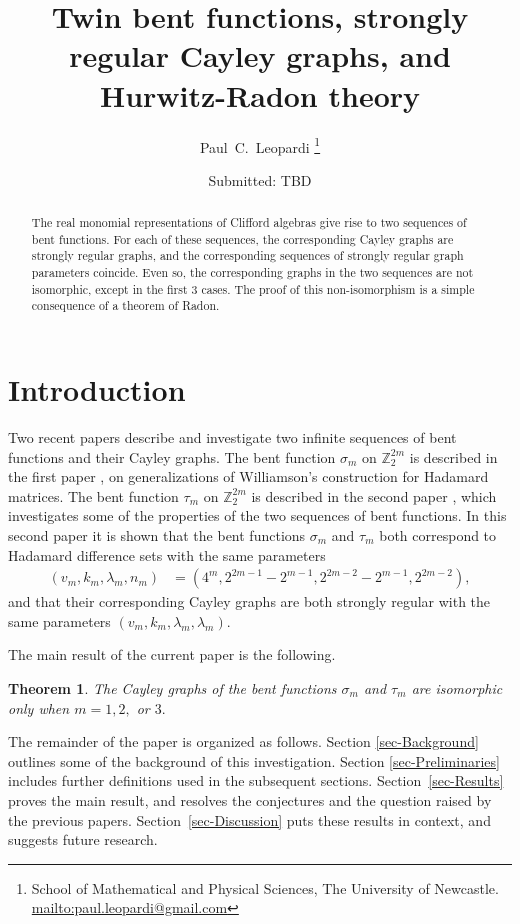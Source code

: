 \documentclass[12pt,a4paper]{article}
\title{Twin bent functions, strongly regular Cayley graphs, and Hurwitz-Radon theory}
\author{
Paul~C.~Leopardi
\thanks{School of Mathematical and Physical Sciences, The University of Newcastle.
\protect\url{mailto:paul.leopardi@gmail.com}}
}
\date{Submitted: TBD}
\newcommand{\mb}[1]{\mathbb{#1}}
\newcommand{\Z}{\mb{Z}}
\newtheorem{Theorem}{Theorem}
\begin{document}
\maketitle

\begin{abstract}
%
The real monomial representations of Clifford algebras
give rise to two sequences of bent functions.
For each of these sequences, the corresponding Cayley graphs are 
strongly regular graphs, and the corresponding sequences of strongly regular graph parameters coincide.
Even so, the corresponding graphs in the two sequences are not isomorphic, except in the first 3 cases.
The proof of this non-isomorphism is a simple consequence of a theorem of Radon.  
%
\end{abstract}

\section{Introduction}
\label{sec-Introduction}
Two recent papers \cite{Leo14Constructions,Leo15Twin} describe and investigate two infinite sequences of bent functions and their Cayley graphs.
The bent function $\sigma_m$ on $\Z_2^{2 m}$ is described in the first paper \cite{Leo14Constructions}, on 
generalizations of Williamson's construction for Hada\-mard matrices.
The bent function $\tau_m$ on $\Z_2^{2 m}$ is described in the second paper \cite{Leo15Twin},
which investigates some of the properties of the two sequences of bent functions.
In this second paper it is shown that the bent functions $\sigma_m$ and $\tau_m$ both correspond to Hada\-mard difference sets with the same parameters
\begin{align*}
(v_m,k_m,\lambda_m,n_m) &= (4^m, 2^{2 m - 1} - 2^{m-1}, 2^{2 m - 2} - 2^{m-1}, 2^{2 m - 2}),
\end{align*}
and that their corresponding Cayley graphs are both strongly regular with the same parameters $(v_m,k_m,\lambda_m,\lambda_m)$.

The main result of the current paper is the following.
\begin{Theorem}\label{HR-non-imomorphic-theorem}
The Cayley graphs of the bent functions $\sigma_m$ and $\tau_m$ are isomorphic only when $m=1, 2,$ or $3.$ 
\end{Theorem}

The remainder of the paper is organized as follows.
Section \ref{sec-Background} outlines some of the background of this investigation.
Section \ref{sec-Preliminaries} includes further definitions used in the subsequent sections.
Section~\ref{sec-Results} proves the main result, and resolves the conjectures and the question raised by the previous papers.
Section~\ref{sec-Discussion} puts these results in context, and suggests future research.
\end{document}
